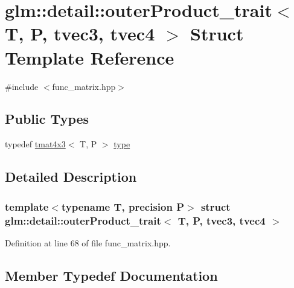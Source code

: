 \hypertarget{structglm_1_1detail_1_1outer_product__trait_3_01_t_00_01_p_00_01tvec3_00_01tvec4_01_4}{}\section{glm\+::detail\+::outer\+Product\+\_\+trait$<$ T, P, tvec3, tvec4 $>$ Struct Template Reference}
\label{structglm_1_1detail_1_1outer_product__trait_3_01_t_00_01_p_00_01tvec3_00_01tvec4_01_4}


{\ttfamily \#include $<$func\+\_\+matrix.\+hpp$>$}

\subsection*{Public Types}
\begin{DoxyCompactItemize}
\item 
typedef \mbox{\hyperlink{structglm_1_1tmat4x3}{tmat4x3}}$<$ T, P $>$ \mbox{\hyperlink{structglm_1_1detail_1_1outer_product__trait_3_01_t_00_01_p_00_01tvec3_00_01tvec4_01_4_ad7ef7d688ded0e316f8b5702a834a68f}{type}}
\end{DoxyCompactItemize}


\subsection{Detailed Description}
\subsubsection*{template$<$typename T, precision P$>$\newline
struct glm\+::detail\+::outer\+Product\+\_\+trait$<$ T, P, tvec3, tvec4 $>$}



Definition at line 68 of file func\+\_\+matrix.\+hpp.



\subsection{Member Typedef Documentation}
\mbox{\label{structglm_1_1detail_1_1outer_product__trait_3_01_t_00_01_p_00_01tvec3_00_01tvec4_01_4_ad7ef7d688ded0e316f8b5702a834a68f}} 
